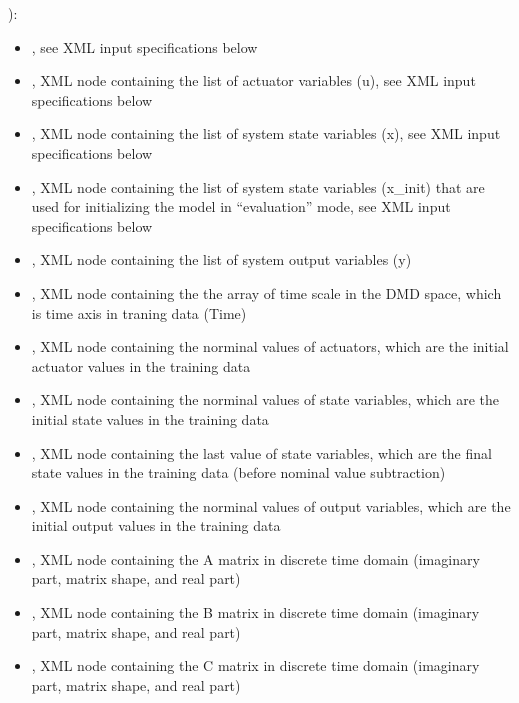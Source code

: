   ):         \begin{itemize}           \item {}, see XML input
  specifications below           \item {}, XML node containing the list of actuator
  variables (u),                  see XML input specifications below           \item
  , XML node containing the list of system state variables (x),
  see XML input specifications below           \item {}, XML node
  containing the list of system state variables                 (x\_init) that are used for
  initializing the model in ``evaluation'' mode,                  see XML input specifications below
  \item {}, XML node containing the list of system output variables (y)
  \item {}, XML node containing the the array of time scale in the DMD space,
  which is time axis in traning data (Time)           \item {}, XML node containing the
  norminal values of actuators,                  which are the initial actuator values in the
  training data           \item {}, XML node containing the norminal values of state
  variables,                 which are the initial state values in the training data           \item
  , XML node containing the last value of state variables,                 which are
  the final state values in the training data (before nominal value subtraction)           \item
  , XML node containing the norminal values of output variables,
  which are the initial output values in the training data           \item {},  XML
  node containing the A matrix in discrete time domain                 (imaginary part, matrix
  shape, and real part)           \item {}, XML node containing the B matrix in
  discrete time domain                 (imaginary part, matrix shape, and real part)           \item
  , XML node containing the C matrix in discrete time domain
  (imaginary part, matrix shape, and real part)         \end{itemize}

